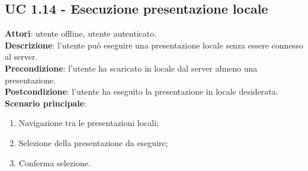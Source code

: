 \subsection{UC 1.14 - Esecuzione presentazione locale}{
\label{uc1.14}
	\textbf{Attori}: utente offline, utente autenticato.\\
	\textbf{Descrizione}: l'utente può eseguire una presentazione locale senza essere connesso al server.\\
	\textbf{Precondizione}: l'utente ha scaricato in locale dal server almeno una presentazione.\\
	\textbf{Postcondizione}: l'utente ha eseguito la presentazione in locale desiderata.\\
	\textbf{Scenario principale}:
	\begin{enumerate}
		\item Navigazione tra le presentazioni locali;
		\item Selezione della presentazione da eseguire;
		\item Conferma selezione.
	\end{enumerate}
}